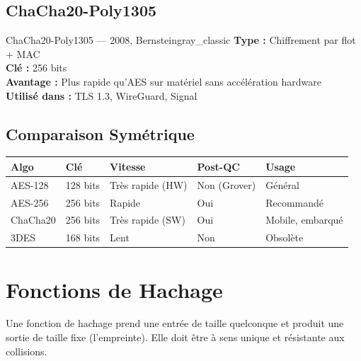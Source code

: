 \documentclass[12pt, a4paper]{article}
\begin{document}
\subsection{ChaCha20-Poly1305}

\begin{algobox}{ChaCha20-Poly1305 --- 2008, Bernstein}{gray_classic}
\textbf{Type :} Chiffrement par flot + MAC\\
\textbf{Clé :} 256 bits\\
\textbf{Avantage :} Plus rapide qu'AES sur matériel sans accélération hardware\\
\textbf{Utilisé dans :} TLS 1.3, WireGuard, Signal
\end{algobox}

\subsection{Comparaison Symétrique}

\begin{center}
\renewcommand{\arraystretch}{1.4}
\begin{tabular}{lllll}
  \toprule
  \textbf{Algo} & \textbf{Clé} & \textbf{Vitesse} & \textbf{Post-QC} & \textbf{Usage} \\
  \midrule
  AES-128 & 128 bits & Très rapide (HW) & Non (Grover) & Général \\
  AES-256 & 256 bits & Rapide & Oui & Recommandé \\
  ChaCha20 & 256 bits & Très rapide (SW) & Oui & Mobile, embarqué \\
  3DES & 168 bits & Lent & Non & Obsolète \\
  \bottomrule
\end{tabular}
\end{center}

\section{Fonctions de Hachage}

Une fonction de hachage prend une entrée de taille quelconque et produit une sortie
de taille fixe (l'empreinte). Elle doit être à sens unique et résistante aux collisions.
\end{document}
